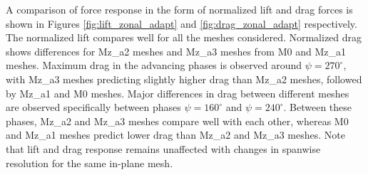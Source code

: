 
A comparison of force response in the form of normalized lift and drag forces is shown in Figures \ref{fig:lift_zonal_adapt} and \ref{fig:drag_zonal_adapt} respectively. The normalized lift compares well for all the meshes considered. Normalized drag shows differences for Mz\_a2 meshes and Mz\_a3 meshes from M0 and Mz\_a1 meshes. Maximum drag in the advancing phases is observed around $\psi=270^\circ$, with Mz\_a3 meshes predicting slightly higher drag than Mz\_a2 meshes, followed by Mz\_a1 and M0 meshes. Major differences in drag between different meshes are observed specifically between phases $\psi=160^\circ$ and $\psi=240^\circ$. Between these phases, Mz\_a2 and Mz\_a3 meshes compare well with each other, whereas M0 and Mz\_a1 meshes predict lower drag than Mz\_a2 and Mz\_a3 meshes. Note that lift and drag response remains unaffected with changes in spanwise resolution for the same in-plane mesh.

